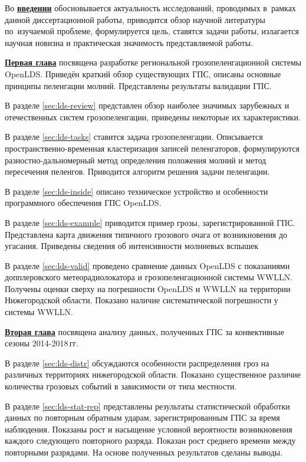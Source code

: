 Во \underline{\textbf{введении}} обосновывается актуальность
исследований, проводимых в~рамках данной диссертационной работы,
приводится обзор научной литературы по~изучаемой проблеме,
формулируется цель, ставятся задачи работы, излагается научная новизна
и практическая значимость представляемой работы.

\underline{\textbf{Первая глава}} посвящена разработке региональной грозопеленгационной системы OpenLDS. Приведён краткий обзор существующих ГПС, описаны основные принципы пеленгации молний. Представлены результаты валидации ГПС.

В разделе \ref{sec:lds-review} представлен обзор наиболее значимых зарубежных и отечественных систем грозопеленгации, приведены некоторые их характеристики.

В разделе \ref{sec:lds-tasks} ставится задача грозопеленгации. Описывается пространственно-временная кластеризация записей пеленгаторов, формулируются разностно-дальномерный метод определения положения молний и метод пересечения пеленгов. Приводится алгоритм решения задачи пеленгации.

В разделе \ref{sec:lds-inside} описано техническое устройство и особенности программного обеспечения ГПС OpenLDS.

В разделе \ref{sec:lds-example} приводится пример грозы, зарегистрированной ГПС. Представлена карта движения типичного грозового очага от возникновения до угасания. Приведены сведения об интенсивности молниевых вспышек

В разделе \ref{sec:lds-valid} проведено сравнение данных OpenLDS с показаниями допплеровского метеорадиолокатора и грозопеленгационной системы WWLLN. Получены оценки сверху на погрешности OpenLDS и WWLLN на территории Нижегородской области. Показано наличие систематической погрешности у системы WWLLN.

\underline{\textbf{Вторая глава}} посвящена анализу данных, полученных ГПС за конвективные сезоны 2014-2018\,гг.

В разделе \ref{sec:lds-distr} обсуждаются особенности распределения гроз на различных территориях нижегородской области. Показано существенное различие количества грозовых событий в зависимости от типа местности.

В разделе \ref{sec:lds-stat-rep} представлены результаты статистической обработки данных по повторным обратным ударам, зарегистрированным ГПС за время наблюдения. Показаны рост и насыщение условной вероятности возникновения каждого следующего повторного разряда. Показан рост среднего времени между повторными разрядами. На основе полученных результатов сделаны выводы.

